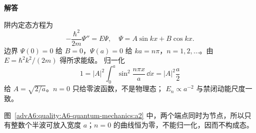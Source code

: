 \begin{advsolution}
\begin{center}\begin{minipage}{.96\linewidth}\centering
\raggedright{\bfseries\color{DeepBlue}解答}\par\smallskip\centering

\label{advA6:quality:A6-quantum-mechanics:a2}
\end{minipage}\end{center}

阱内定态方程为
\[
 -\frac{\hbar^2}{2m}\Psi''=E\Psi,
\quad
 \Psi=A\sin kx+B\cos kx.
\]
边界 $\Psi(0)=0$ 给 $B=0$，$\Psi(a)=0$ 给
$ka=n\pi$，$n=1,2,\ldots$。由 $E=\hbar^2k^2/(2m)$ 得所求能级。
归一化
\[
 1=|A|^2\int_0^a\sin^2\frac{n\pi x}{a}\,\dd x
 =|A|^2\frac a2
\]
给 $A=\sqrt{2/a}$。$n=0$ 只给零波函数，不是物理态；
$E_n\propto a^{-2}$ 与禁闭动能尺度一致。

图~\ref{advA6:quality:A6-quantum-mechanics:a2} 中，两个端点同时为节点，所以只有整数个半波可放入宽度 $a$；$n=0$ 的曲线恒为零，不能归一化，因而不构成态。
\end{advsolution}

